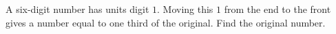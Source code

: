 A six-digit number has units digit $1$. Moving this $1$ from the end to the front gives a number equal to one third of the original. Find the original number.
